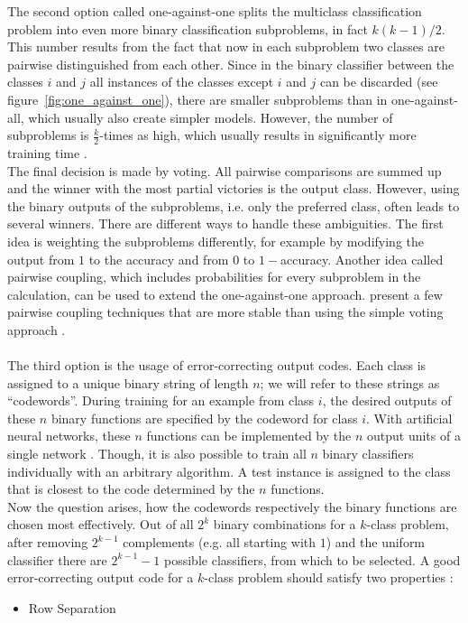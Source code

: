 \documentclass[article,type=msc,colorback,accentcolor=tud7b]{tudthesis}
\begin{document}
\begin{itemize}
        The second option called one-against-one splits the multiclass classification problem into even more binary classification subproblems, in fact $k(k-1)/2$. This number results from the fact that now in each subproblem two classes are pairwise distinguished from each other. Since in the binary classifier between the classes $i$ and $j$ all instances of the classes except $i$ and $j$ can be discarded (see figure~\ref{fig:one_against_one}), there are smaller subproblems than in one-against-all, which usually also create simpler models. However, the number of subproblems is $\frac{k}{2}$-times as high, which usually results in significantly more training time \autocite[Subsection~7.1.3]{Bishop2006}. \\
        The final decision is made by voting. All pairwise comparisons are summed up and the winner with the most partial victories is the output class. However, using the binary outputs of the subproblems, i.e. only the preferred class, often leads to several winners. There are different ways to handle these ambiguities. The first idea is weighting the subproblems differently, for example by modifying the output from $1$ to the accuracy and from $0$ to $1-$accuracy. Another idea called pairwise coupling, which includes probabilities for every subproblem in the calculation, can be used to extend the one-against-one approach. \citeauthor{Wu2004} present a few pairwise coupling techniques that are more stable than using the simple voting approach \autocite{Wu2004}. \\\\

        The third option is the usage of error-correcting output codes. Each class is assigned to a unique binary string of length $n$; we will refer to these strings as “codewords”. During training for an example from class $i$, the desired outputs of these $n$ binary functions are specified by the codeword for class $i$. With artificial neural networks, these $n$ functions can be implemented by the $n$ output units of a single network \autocite[Section~1]{Dietterich1994}. Though, it is also possible to train all $n$ binary classifiers individually with an arbitrary algorithm. A test instance is assigned to the class that is closest to the code determined by the $n$ functions. \\
        Now the question arises, how the codewords respectively the binary functions are chosen most effectively. Out of all $2^{k}$ binary combinations for a $k$-class problem, after removing $2^{k-1}$ complements (e.g. all starting with $1$) and the uniform classifier there are $2^{k-1}-1$ possible classifiers, from which to be selected. A good error-correcting output code for a $k$-class problem should satisfy two properties \autocite[Subsection~2.3]{Dietterich1994}:
        \begin{itemize}
          \item Row Separation


\end{itemize}
\end{itemize}
\end{document}
